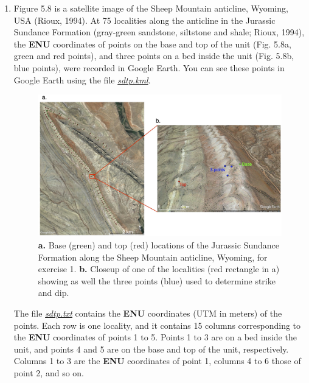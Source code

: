 \documentclass[a4paper , 12pt]{book}
\begin{document}
\begin{enumerate}

    \item Figure 5.8 is a satellite image of the Sheep Mountain anticline, Wyoming, USA (Rioux, 1994). At 75 localities along the anticline in the Jurassic Sundance Formation (gray-green sandstone, siltstone and shale; Rioux, 1994), the \textbf{ENU} coordinates of points on the base and top of the unit (Fig. 5.8a, green and red points), and three points on a bed inside the unit (Fig. 5.8b, blue points), were recorded in Google Earth. You can see these points in Google Earth using the file \href{https://github.com/nfcd/compGeo/blob/master/source/data/ch5-exercise1/sdtp.kml}{\textit{sdtp.kml}}. 
    
    \begin{figure}[ht]
    \centering
    \includegraphics[width=14cm]{Figures/ch5f13.jpg}
    \caption{\textbf{a.} Base (green) and top (red) locations of the Jurassic Sundance Formation along the Sheep Mountain anticline, Wyoming, for exercise 1. \textbf{b.} Closeup of one of the localities (red rectangle in a) showing as well the three points (blue) used to determine strike and dip.}
    \end{figure}
    
    The file \href{https://github.com/nfcd/compGeo/blob/master/source/data/ch5-exercise1/sdtp.txt}{\textit{sdtp.txt}} contains the \textbf{ENU} coordinates (UTM in meters) of the points. Each row is one locality, and it contains 15 columns corresponding to the \textbf{ENU} coordinates of points 1 to 5. Points 1 to 3 are on a bed inside the unit, and points 4 and 5 are on the base and top of the unit, respectively. Columns 1 to 3 are the \textbf{ENU} coordinates of point 1, columns 4 to 6 those of point 2, and so on. 
    

\end{enumerate}
\end{document}
